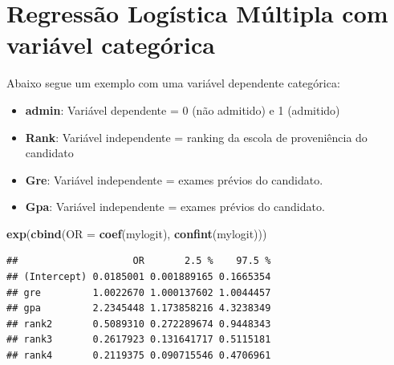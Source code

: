 \documentclass[12pt,brazil,]{book}
\newenvironment{Shaded}{\begin{snugshade}}{\end{snugshade}}
\newcommand{\DataTypeTok}[1]{\textcolor[rgb]{0.13,0.29,0.53}{#1}}
\newcommand{\KeywordTok}[1]{\textcolor[rgb]{0.13,0.29,0.53}{\textbf{#1}}}
\newcommand{\NormalTok}[1]{#1}
\newcommand{\OperatorTok}[1]{\textcolor[rgb]{0.81,0.36,0.00}{\textbf{#1}}}
\newcommand{\StringTok}[1]{\textcolor[rgb]{0.31,0.60,0.02}{#1}}
\providecommand{\tightlist}{%
  \setlength{\itemsep}{0pt}\setlength{\parskip}{0pt}}
\begin{document}
\hypertarget{regressao-logistica-multipla-com-variavel-categorica}{%
\section{Regressão Logística Múltipla com variável
categórica}\label{regressao-logistica-multipla-com-variavel-categorica}}

Abaixo segue um exemplo com uma variável dependente categórica:

\begin{itemize}
\tightlist
\item
  \textbf{admin}: Variável dependente = 0 (não admitido) e 1 (admitido)
\item
  \textbf{Rank}: Variável independente = ranking da escola de
  proveniência do candidato
\item
  \textbf{Gre}: Variável independente = exames prévios do candidato.
\item
  \textbf{Gpa}: Variável independente = exames prévios do candidato.
\end{itemize}

\begin{Shaded}
\end{Shaded}

\begin{Shaded}
\begin{Highlighting}[]
\KeywordTok{exp}\NormalTok{(}\KeywordTok{cbind}\NormalTok{(}\DataTypeTok{OR =} \KeywordTok{coef}\NormalTok{(mylogit), }\KeywordTok{confint}\NormalTok{(mylogit)))}
\end{Highlighting}
\end{Shaded}

\begin{verbatim}
##                    OR       2.5 %    97.5 %
## (Intercept) 0.0185001 0.001889165 0.1665354
## gre         1.0022670 1.000137602 1.0044457
## gpa         2.2345448 1.173858216 4.3238349
## rank2       0.5089310 0.272289674 0.9448343
## rank3       0.2617923 0.131641717 0.5115181
## rank4       0.2119375 0.090715546 0.4706961
\end{verbatim}

\printbibliography[segment=\therefsegment,heading=subbibliography]

\printbibliography
\end{document}

